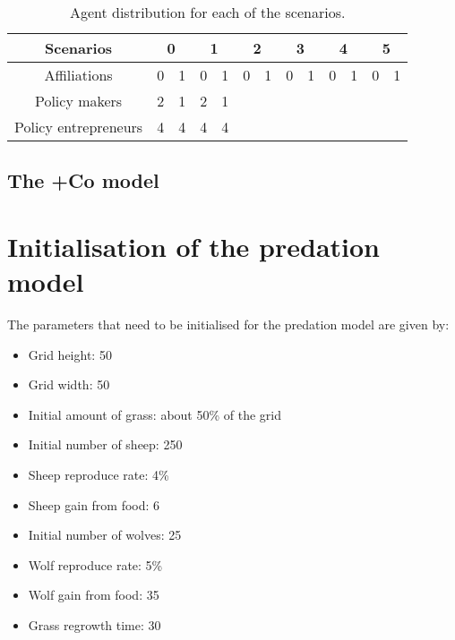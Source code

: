 \documentclass[12pt]{article}
\begin{document}
\begin{table}[h!]
\begin{center}
\begin{tabular}{ |c|c|c|c|c|c|c|c|c|c|c|c|c| } 
\hline

Scenarios		& \multicolumn{2}{|c|}{0}	
					& \multicolumn{2}{|c|}{1}	
							& \multicolumn{2}{|c|}{2}	
									& \multicolumn{2}{|c|}{3}	
											& \multicolumn{2}{|c|}{4}	
													& \multicolumn{2}{|c|}{5}	 
															\\ \hline \hline
Affiliations		& 0	& 1	&  0	& 1	&  0	& 1	&  0	& 1 	&  0	& 1	&  0	& 1	\\ \hline
Policy makers 	& 2	& 1	& 2	& 1	& 	&	&	&	&	&	&	& 	\\ \hline
Policy entrepreneurs
			& 4	& 4	& 4	& 4	& 	&	&	&	&	&	&	& 	\\ \hline
\end{tabular}
\end{center}
\caption{Agent distribution for each of the scenarios.}
\label{tab:agentDistribution}
\end{table}



\subsection{The +Co model}


\section{Initialisation of the predation model}
\label{sec:predation_initialisation}

The parameters that need to be initialised for the predation model are given by:

\begin{itemize}
\item Grid height: 50
\item Grid width: 50
\item Initial amount of grass: about 50\% of the grid
\item Initial number of sheep: 250
\item Sheep reproduce rate: 4\%
\item Sheep gain from food: 6
\item Initial number of wolves: 25
\item Wolf reproduce rate: 5\%
\item Wolf gain from food: 35
\item Grass regrowth time: 30
\end{itemize}
\end{document}
